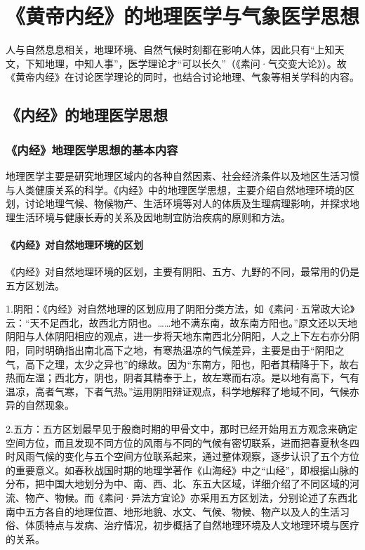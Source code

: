 \documentclass[draft,12pt]{ctexbook}
\begin{document}
\pagestyle{main}
\fi
\chapter{《黄帝内经》的地理医学与气象医学思想}%

人与自然息息相关，地理环境、自然气候时刻都在影响人体，因此只有“上知天文，下知地理，中知人事”，医学理论才“可以长久”（《素问·气交变大论》）。故《黄帝内经》在讨论医学理论的同时，也结合讨论地理、气象等相关学科的内容。

\section{《内经》的地理医学思想}%

\subsection{《内经》地理医学思想的基本内容}%

地理医学主要是研究地理区域内的各种自然因素、社会经济条件以及地区生活习惯与人类健康关系的科学。《内经》中的地理医学思想，主要介绍自然地理环境的区划，讨论地理气候、物候物产、生活环境等对人的体质及生理病理影响，并探求地理生活环境与健康长寿的关系及因地制宜防治疾病的原则和方法。

\subsubsection{《内经》对自然地理环境的区划}%

《内经》对自然地理环境的区划，主要有阴阳、五方、九野的不同，最常用的仍是五方区划法。

1.阴阳：《内经》对自然地理的区划应用了阴阳分类方法，如《素问·五常政大论》云：“天不足西北，故西北方阴也。……地不满东南，故东南方阳也。”原文还以天地阴阳与人体阴阳相应的观点，进一步将天地东南西北分阴阳，人之上下左右亦分阴阳，同时明确指出南北高下之地，有寒热温凉的气候差异，主要是由于“阴阳之气，高下之理，太少之异也”的缘故。因为“东南方，阳也，阳者其精降于下，故右热而左温；西北方，阴也，阴者其精奉于上，故左寒而右凉。是以地有高下，气有温凉，高者气寒，下者气热。”运用阴阳辩证观点，科学地解释了地域不同，气候亦异的自然现象。

2.五方：五方区划最早见于殷商时期的甲骨文中，那时已经开始用五方观念来确定空间方位，而且发现不同方位的风雨与不同的气候有密切联系，进而把春夏秋冬四时风雨气候的变化与五个空间方位联系起来，通过整体观察，逐步认识了五个方位的重要意义。如春秋战国时期的地理学著作《山海经》中之“山经”，即根据山脉的分布，把中国大地划分为中、南、西、北、东五大区域，详细介绍了不同区域的河流、物产、物候。而《素问·异法方宜论》亦采用五方区划法，分别论述了东西北南中五方各自的地理位置、地形地貌、水文、气候、物候、物产以及人的生活习俗、体质特点与发病、治疗情况，初步概括了自然地理环境及人文地理环境与医疗的关系。
\end{document}
